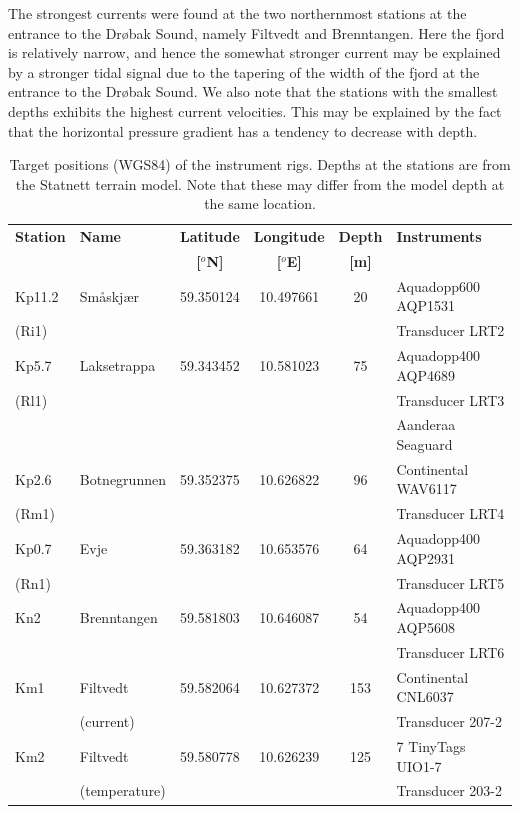 The strongest currents were found at the two northernmost stations at the entrance to the Dr{\o}bak Sound, namely Filtvedt and Brenntangen. Here the fjord is relatively narrow, and hence the somewhat stronger current may be explained by a stronger tidal signal due to the tapering of the width of the fjord at the entrance to the Dr{\o}bak Sound. We also note that the stations with the smallest depths exhibits the highest current velocities. This may be explained by the fact that the horizontal pressure gradient has a tendency to decrease with depth.




\begin{table}[ht] 
\caption{Target positions (WGS84) of the instrument rigs. Depths at the stations are from the Statnett terrain model. Note that these may differ from the model depth at the same location.} 
\label{tab:Statnett} 
\centering 
\begin{tabular}{|llcccl|} 
\hline  
{\bf Station} & {\bf Name} & {\bf Latitude} & {\bf Longitude} & {\bf Depth} & {\bf Instruments} \\ 
&& {\bf [$^o$N]} & {\bf [$^o$E]} & {\bf [m]} & \\ \hline
Kp11.2 & Sm\aa skj\ae r & 59.350124 & 10.497661 & 20 & Aquadopp600 AQP1531 \\
(Ri1) &&&&& Transducer LRT2 \\ \hline
Kp5.7 & Laksetrappa & 59.343452 & 10.581023 & 75 & Aquadopp400 AQP4689 \\
(Rl1) &&&&& Transducer LRT3 \\
      &&&&& Aanderaa Seaguard \\  \hline
Kp2.6 & Botnegrunnen & 59.352375 & 10.626822 & 96 & Continental WAV6117 \\
(Rm1) &&&&& Transducer LRT4 \\ \hline
Kp0.7 & Evje & 59.363182 & 10.653576 & 64 & Aquadopp400 AQP2931 \\
(Rn1) &&&&& Transducer LRT5 \\ \hline
Kn2 & Brenntangen & 59.581803 & 10.646087 & 54 & Aquadopp400 AQP5608 \\
      &&&&& Transducer LRT6 \\ \hline
Km1 & Filtvedt & 59.582064 & 10.627372 & 153 & Continental CNL6037 \\
      & (current) &&&& Transducer 207-2 \\ \hline
Km2 & Filtvedt & 59.580778 & 10.626239 & 125 & 7 TinyTags UIO1-7 \\
      & (temperature) &&&& Transducer 203-2 \\
\hline
\end{tabular}
\end{table}

